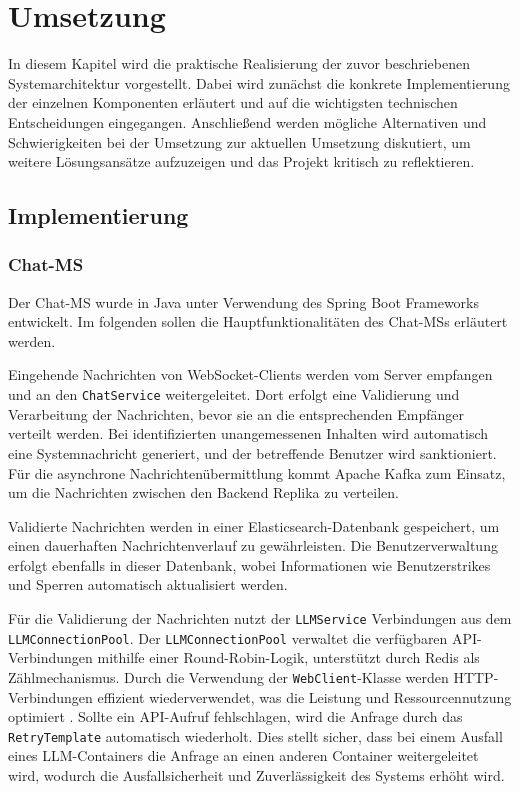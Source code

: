 \documentclass[12pt]{report}
\begin{document}
\chapter{Umsetzung}

In diesem Kapitel wird die praktische Realisierung der zuvor beschriebenen Systemarchitektur vorgestellt. Dabei wird zunächst die konkrete Implementierung der einzelnen Komponenten erläutert und auf die wichtigsten technischen Entscheidungen eingegangen. Anschließend werden mögliche Alternativen und Schwierigkeiten bei der Umsetzung zur aktuellen Umsetzung diskutiert, um weitere Lösungsansätze aufzuzeigen und das Projekt kritisch zu reflektieren.

\section{Implementierung}

\subsection{Chat-MS}
Der Chat-MS wurde in Java unter Verwendung des Spring Boot Frameworks entwickelt. Im folgenden sollen die Hauptfunktionalitäten des Chat-MSs erläutert werden.\newline

Eingehende Nachrichten von WebSocket-Clients werden vom Server empfangen und an den \texttt{ChatService} weitergeleitet. Dort erfolgt eine Validierung und Verarbeitung der Nachrichten, bevor sie an die entsprechenden Empfänger verteilt werden. Bei identifizierten unangemessenen Inhalten wird automatisch eine Systemnachricht generiert, und der betreffende Benutzer wird sanktioniert. Für die asynchrone Nachrichtenübermittlung kommt Apache Kafka zum Einsatz, um die Nachrichten zwischen den Backend Replika zu verteilen.\newline

Validierte Nachrichten werden in einer Elasticsearch-Datenbank gespeichert, um einen dauerhaften Nachrichtenverlauf zu gewährleisten. Die Benutzerverwaltung erfolgt ebenfalls in dieser Datenbank, wobei Informationen wie Benutzerstrikes und Sperren automatisch aktualisiert werden.\newline

Für die Validierung der Nachrichten nutzt der \texttt{LLMService} Verbindungen aus dem \texttt{LLMConnectionPool}. Der \texttt{LLMConnectionPool} verwaltet die verfügbaren API-Verbindungen mithilfe einer Round-Robin-Logik, unterstützt durch Redis als Zählmechanismus. Durch die Verwendung der \texttt{WebClient}-Klasse werden HTTP-Verbindungen effizient wiederverwendet, was die Leistung und Ressourcennutzung optimiert \cite{spring-webclient}. Sollte ein API-Aufruf fehlschlagen, wird die Anfrage durch das \texttt{RetryTemplate} automatisch wiederholt. Dies stellt sicher, dass bei einem Ausfall eines LLM-Containers die Anfrage an einen anderen Container weitergeleitet wird, wodurch die Ausfallsicherheit und Zuverlässigkeit des Systems erhöht wird.\newline
\end{document}
